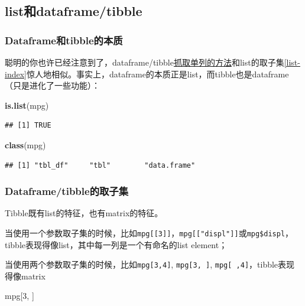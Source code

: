 \documentclass[]{book}
\newenvironment{Shaded}{\begin{snugshade}}{\end{snugshade}}
\newcommand{\DecValTok}[1]{\textcolor[rgb]{0.00,0.00,0.81}{#1}}
\newcommand{\KeywordTok}[1]{\textcolor[rgb]{0.13,0.29,0.53}{\textbf{#1}}}
\newcommand{\NormalTok}[1]{#1}
\begin{document}
\hypertarget{listdataframetibble}{%
\subsection{list和dataframe/tibble}\label{listdataframetibble}}

\hypertarget{dataframetibble}{%
\subsubsection{Dataframe和tibble的本质}\label{dataframetibble}}

聪明的你也许已经注意到了，dataframe/tibble\protect\hyperlink{single-column}{抓取单列的方法}和list的取子集\ref{list-index}惊人地相似。事实上，dataframe的本质正是list，而tibble也是dataframe（只是进化了一些功能）：

\begin{Shaded}
\begin{Highlighting}[]
\KeywordTok{is.list}\NormalTok{(mpg)}
\end{Highlighting}
\end{Shaded}

\begin{verbatim}
## [1] TRUE
\end{verbatim}

\begin{Shaded}
\begin{Highlighting}[]
\KeywordTok{class}\NormalTok{(mpg)}
\end{Highlighting}
\end{Shaded}

\begin{verbatim}
## [1] "tbl_df"     "tbl"        "data.frame"
\end{verbatim}

\hypertarget{tbl-subsetting-more}{%
\subsubsection{Dataframe/tibble的取子集}\label{tbl-subsetting-more}}

Tibble既有list的特征，也有matrix的特征。

当使用一个参数取子集的时候，比如\texttt{mpg{[}{[}3{]}{]}}，\texttt{mpg{[}{[}"displ"{]}{]}}或\texttt{mpg\$displ}，tibble表现得像list，其中每一列是一个有命名的list element；

当使用两个参数取子集的时候，比如\texttt{mpg{[}3,4{]}}, \texttt{mpg{[}3,\ {]}}, \texttt{mpg{[}\ ,4{]}}，tibble表现得像matrix

\begin{Shaded}
\begin{Highlighting}[]
\NormalTok{mpg[}\DecValTok{3}\NormalTok{, ]}
\end{Highlighting}
\end{Shaded}
\end{document}
